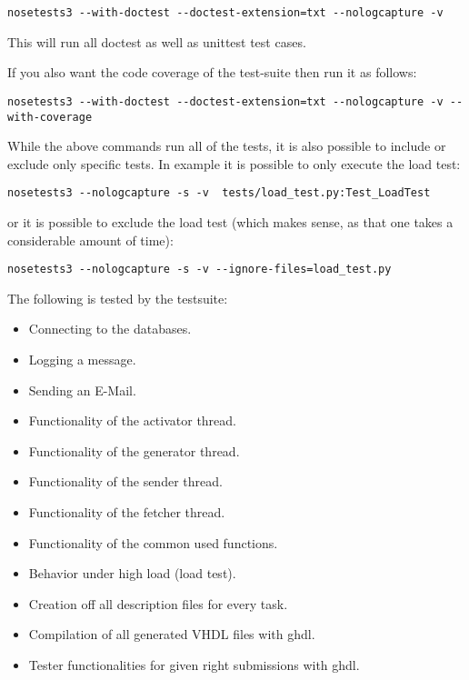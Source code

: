 \begin{verbatim}
nosetests3 --with-doctest --doctest-extension=txt --nologcapture -v
\end{verbatim}

This will run all doctest as well as unittest test cases.

If you also want the code coverage of the test-suite then run it as follows:

\begin{verbatim}
nosetests3 --with-doctest --doctest-extension=txt --nologcapture -v --with-coverage
\end{verbatim}

While the above commands run all of the tests, it is also possible to include or exclude only
specific tests. In example it is possible to only execute the load test:

\begin{verbatim}
nosetests3 --nologcapture -s -v  tests/load_test.py:Test_LoadTest
\end{verbatim}

or it is possible to exclude the load test (which makes sense, as that one takes a considerable
amount of time):

\begin{verbatim}
nosetests3 --nologcapture -s -v --ignore-files=load_test.py
\end{verbatim}

The following is tested by the testsuite:
\begin{itemize}
\item Connecting to the databases.
\item Logging a message.
\item Sending an E-Mail.
\item Functionality of the activator thread.
\item Functionality of the generator thread.
\item Functionality of the sender thread.
\item Functionality of the fetcher thread.
\item Functionality of the common used functions.
\item Behavior under high load (load test).
\item Creation off all description files for every task.
\item Compilation of all generated VHDL files with ghdl.
\item Tester functionalities for given right submissions with ghdl.
\end{itemize}

